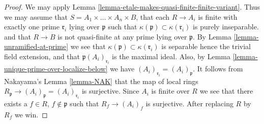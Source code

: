 \begin{proof}
We may apply Lemma \ref{lemma-etale-makes-quasi-finite-finite-variant}.
Thus we may assume that $S = A_1 \times \ldots \times A_n \times B$,
that each $R \to A_i$ is finite with exactly one prime $\mathfrak r_i$
lying over $\mathfrak p$ such that
$\kappa(\mathfrak p) \subset \kappa(\mathfrak r_i)$ is purely inseparable.
and that $R \to B$ is not quasi-finite at any prime lying over $\mathfrak p$.
By Lemma \ref{lemma-unramified-at-prime} we see that
$\kappa(\mathfrak p) \subset \kappa(\mathfrak r_i)$
is separable hence the trivial field extension, and that
$\mathfrak p(A_i)_{\mathfrak r_i}$ is the maximal ideal.
Also, by Lemma \ref{lemma-unique-prime-over-localize-below}
we have $(A_i)_{\mathfrak r_i} = (A_i)_{\mathfrak p}$.
It follows from Nakayama's Lemma \ref{lemma-NAK}
that the map of local rings
$R_{\mathfrak p} \to (A_i)_{\mathfrak p} = (A_i)_{\mathfrak r_i}$
is surjective. Since $A_i$ is finite over $R$ we see that there
exists a $f \in R$, $f \not \in \mathfrak p$ such that
$R_f \to (A_i)_f$ is surjective. After replacing $R$ by $R_f$ we win.
\end{proof}











































